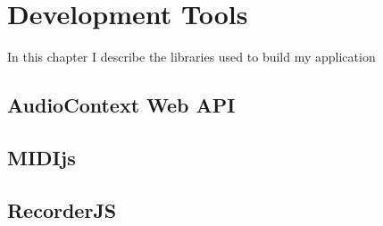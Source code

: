 \chapter{Development Tools}
In this chapter I describe the libraries used to build my application

	\section{AudioContext Web API}
	\section{MIDIjs}
	\section{RecorderJS}


